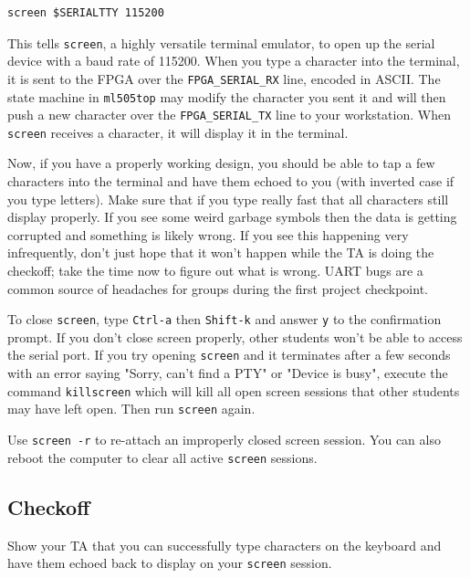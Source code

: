 \documentclass[11pt]{article}
\begin{document}
\begin{verbatim}
screen $SERIALTTY 115200
\end{verbatim}

This tells \verb|screen|, a highly versatile terminal emulator, to open up the serial device with a baud rate of 115200. When you type a character into the terminal, it is sent to the FPGA over the \verb|FPGA_SERIAL_RX| line, encoded in ASCII. The state machine in \verb|ml505top| may modify the character you sent it and will then push a new character over the \verb|FPGA_SERIAL_TX| line to your workstation. When \verb|screen| receives a character, it will display it in the terminal.

Now, if you have a properly working design, you should be able to tap a few characters into the terminal and have them echoed to you (with inverted case if you type letters). Make sure that if you type really fast that all characters still display properly. If you see some weird garbage symbols then the data is getting corrupted and something is likely wrong. If you see this happening very infrequently, don't just hope that it won't happen while the TA is doing the checkoff; take the time now to figure out what is wrong. UART bugs are a common source of headaches for groups during the first project checkpoint. 

To close \verb|screen|, type \verb|Ctrl-a| then \verb|Shift-k| and answer \verb|y| to the confirmation prompt. If you don't close screen properly, other students won't be able to access the serial port. If you try opening \verb|screen| and it terminates after a few seconds with an error saying "Sorry, can't find a PTY" or "Device is busy", execute the command \verb|killscreen| which will kill all open screen sessions that other students may have left open. Then run \verb|screen| again.

Use \verb|screen -r| to re-attach an improperly closed screen session. You can also reboot the computer to clear all active \verb|screen| sessions.

\subsection{Checkoff}
Show your TA that you can successfully type characters on the keyboard and have them echoed back to display on your \verb|screen| session.
\end{document}
